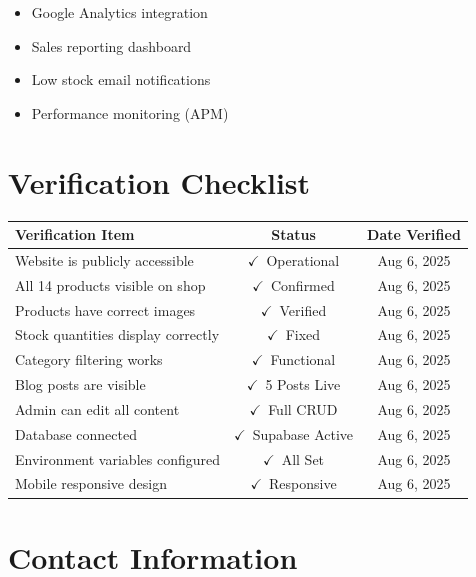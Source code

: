 \documentclass[11pt,a4paper]{article}
\newcommand{\mycheck}{\textcolor{ispeak-green}{\textbf{$\checkmark$}}}
\begin{document}
\begin{tcolorbox}[colback=ispeak-green!10, colframe=ispeak-green, title=\textbf{Phase 3: Analytics \& Monitoring}]
\begin{itemize}[leftmargin=*]
    \item Google Analytics integration
    \item Sales reporting dashboard
    \item Low stock email notifications
    \item Performance monitoring (APM)
\end{itemize}
\end{tcolorbox}

\newpage

\section{Verification Checklist}

\begin{center}
\begin{tabular}{|l|c|c|}
\hline
\rowcolor{header-bg!10}
\textbf{Verification Item} & \textbf{Status} & \textbf{Date Verified} \\
\hline
Website is publicly accessible & \mycheck\ Operational & Aug 6, 2025 \\
\hline
All 14 products visible on shop & \mycheck\ Confirmed & Aug 6, 2025 \\
\hline
Products have correct images & \mycheck\ Verified & Aug 6, 2025 \\
\hline
Stock quantities display correctly & \mycheck\ Fixed & Aug 6, 2025 \\
\hline
Category filtering works & \mycheck\ Functional & Aug 6, 2025 \\
\hline
Blog posts are visible & \mycheck\ 5 Posts Live & Aug 6, 2025 \\
\hline
Admin can edit all content & \mycheck\ Full CRUD & Aug 6, 2025 \\
\hline
Database connected & \mycheck\ Supabase Active & Aug 6, 2025 \\
\hline
Environment variables configured & \mycheck\ All Set & Aug 6, 2025 \\
\hline
Mobile responsive design & \mycheck\ Responsive & Aug 6, 2025 \\
\hline
\end{tabular}
\end{center}

\section{Contact Information}
\end{document}
